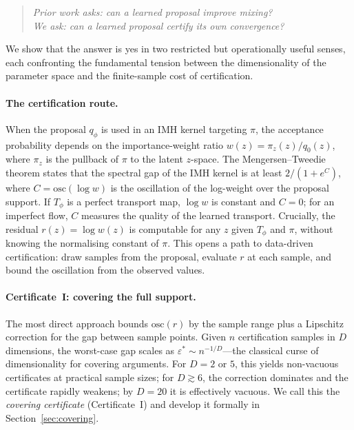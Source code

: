 \documentclass[12pt]{article}
\newcommand{\osc}{\mathrm{osc}}
\begin{document}
\begin{quote}
\emph{Prior work asks: can a learned proposal improve mixing?\\
We ask: can a learned proposal certify its own convergence?}
\end{quote}

We show that the answer is yes in two restricted but operationally useful senses, each confronting the fundamental tension between the dimensionality of the parameter space and the finite-sample cost of certification.

\paragraph{The certification route.}
When the proposal $q_\phi$ is used in an IMH kernel targeting $\pi$, the acceptance probability depends on the importance-weight ratio $w(z) = \pi_z(z)/q_0(z)$, where $\pi_z$ is the pullback of $\pi$ to the latent $z$-space.
The Mengersen--Tweedie theorem \citep{MengersenTweedie1996} states that the spectral gap of the IMH kernel is at least $2/(1 + e^C)$, where $C = \osc(\log w)$ is the oscillation of the log-weight over the proposal support.
If $T_\phi$ is a perfect transport map, $\log w$ is constant and $C = 0$; for an imperfect flow, $C$ measures the quality of the learned transport.
Crucially, the residual $r(z) = \log w(z)$ is computable for any $z$ given $T_\phi$ and $\pi$, without knowing the normalising constant of $\pi$.
This opens a path to data-driven certification: draw samples from the proposal, evaluate $r$ at each sample, and bound the oscillation from the observed values.

\paragraph{Certificate~I: covering the full support.}
The most direct approach bounds $\osc(r)$ by the sample range plus a Lipschitz correction for the gap between sample points.
Given $n$ certification samples in $D$ dimensions, the worst-case gap scales as $\varepsilon^* \sim n^{-1/D}$---the classical curse of dimensionality for covering arguments.
For $D = 2$ or $5$, this yields non-vacuous certificates at practical sample sizes; for $D \gtrsim 6$, the correction dominates and the certificate rapidly weakens; by $D = 20$ it is effectively vacuous.
We call this the \emph{covering certificate} (Certificate~I) and develop it formally in Section~\ref{sec:covering}.
\end{document}
